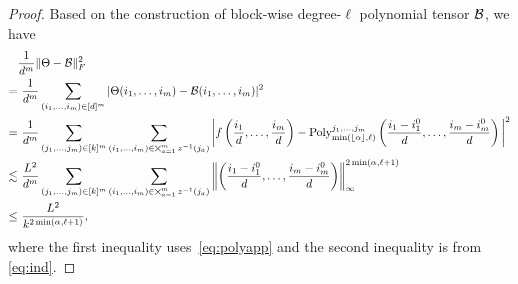 \documentclass[11pt]{article}
\theoremstyle{definition}
\begin{document}
\begin{proof}
Based on the construction of block-wise degree-$\ell$ polynomial tensor $\mathcal{B}$, we have 
\begin{align}
   & \frac{1}{d^m}\FnormSize{}{\Theta-\tB}^2\\
=&\ \frac{1}{d^m} \sum_{(i_1,\ldots,i_m)\in[d]^m}|\Theta(i_1,\ldots,i_m)-\tB(i_1,\ldots,i_m)|^2\\
=&\ \frac{1}{d^m}\sum_{(j_1,\ldots,j_m)\in[k]^m}\sum_{(i_1,\ldots,i_m)\in \bigtimes_{a=1}^m z^{-1}(j_a)}\bigg|f\left(\frac{i_1}{d},\ldots,\frac{i_m}{d}\right)-\text{Poly}^{j_1,\ldots,j_m}_{\min(\lfloor \alpha \rfloor,\ell)}\left(\frac{i_1-i_1^0}{d},\ldots,\frac{i_m-i_m^0}{d}\right)\bigg|^2\\
    \lesssim &\ \frac{L^2}{d^m}\sum_{(j_1,\ldots,j_m)\in[k]^m}\sum_{(i_1,\ldots,i_m)\in \bigtimes_{a=1}^m z^{-1}(j_a)} \left\|\left(\frac{i_1-i_1^0}{d},\ldots,\frac{i_m-i_m^0}{d}\right)\right\|_\infty^{2\min(\alpha,\ell+1)}\\
    \leq&\ \frac{L^2}{k^{2\min(\alpha,\ell+1)}},
\end{align}
where the first inequality uses~\eqref{eq:polyapp} and the second inequality is from \eqref{eq:ind}.
\end{proof}
\end{document}
